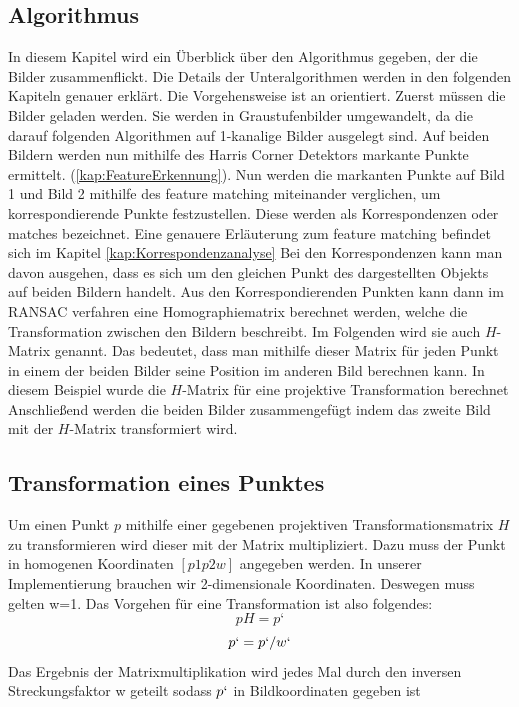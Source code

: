 \subsection{Algorithmus}
In diesem Kapitel wird ein Überblick über den Algorithmus gegeben, der die Bilder zusammenflickt. Die Details der Unteralgorithmen werden in den folgenden Kapiteln genauer erklärt. Die Vorgehensweise ist an \cite{Richard2000} orientiert. Zuerst müssen die Bilder geladen werden. Sie werden in Graustufenbilder umgewandelt, da die darauf folgenden Algorithmen auf 1-kanalige Bilder ausgelegt sind.
Auf beiden Bildern werden nun mithilfe des Harris Corner Detektors markante Punkte ermittelt. (\ref{kap:FeatureErkennung}). Nun werden die markanten Punkte auf Bild 1 und Bild 2 mithilfe des feature matching miteinander verglichen, um korrespondierende Punkte festzustellen. Diese werden als Korrespondenzen oder matches bezeichnet. Eine genauere Erläuterung zum feature matching befindet sich im Kapitel \ref{kap:Korrespondenzanalyse} Bei den Korrespondenzen kann man davon ausgehen, dass es sich um den gleichen Punkt des dargestellten Objekts auf beiden Bildern handelt.
Aus den Korrespondierenden Punkten kann dann im RANSAC verfahren eine Homographiematrix berechnet werden, welche die Transformation zwischen den Bildern beschreibt. Im Folgenden wird sie auch $H$-Matrix genannt. Das bedeutet, dass man mithilfe dieser Matrix für jeden Punkt in einem der beiden Bilder seine Position im anderen Bild berechnen kann.  In diesem Beispiel wurde die $H$-Matrix für eine projektive Transformation berechnet
Anschließend werden die beiden Bilder zusammengefügt indem das zweite Bild mit der $H$-Matrix transformiert wird.

\subsection{Transformation eines Punktes}
Um einen Punkt $p$ mithilfe einer gegebenen projektiven Transformationsmatrix $H$ zu transformieren wird dieser mit der Matrix multipliziert. Dazu muss der Punkt in homogenen Koordinaten $[p1 p2 w]$ angegeben werden. In unserer Implementierung brauchen wir 2-dimensionale Koordinaten. Deswegen muss gelten w=1. Das Vorgehen für eine Transformation ist also folgendes:
 $$p H=p‘$$
$$p`=p`/w`$$
Das Ergebnis der Matrixmultiplikation wird jedes Mal durch den inversen Streckungsfaktor w geteilt sodass $p`$ in Bildkoordinaten gegeben ist

